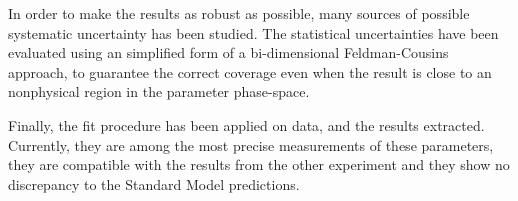 In order to make the results as robust as possible, many sources of possible systematic uncertainty has been studied.
The statistical uncertainties have been evaluated using an simplified form of a bi-dimensional Feldman-Cousins approach, to guarantee the correct coverage even when the result is close to an nonphysical region in the parameter phase-space.

Finally, the fit procedure has been applied on data, and the results extracted.
Currently, they are among the most precise measurements of these parameters, they are compatible with the results from the other experiment and they show no discrepancy to the Standard Model predictions.
